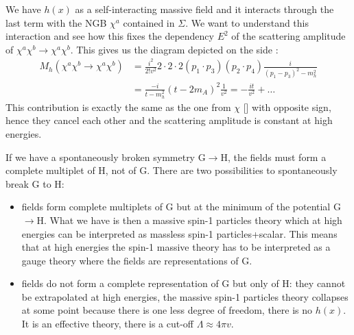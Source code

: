 \documentclass[../main.tex]{subfiles}
\begin{document}
We have $h(x)$ as a self-interacting massive field and it interacts through the last term with the NGB $\chi^a$ contained in $\Sigma$. We want to understand this interaction and see how this fixes the dependency $E^2$ of the scattering amplitude of $\chi^a\chi^b\to\chi^a\chi^b$. This gives us the diagram depicted on the side :
\begin{align*}
M_h(\chi^a\chi^b\to\chi^a\chi^b)&=\frac{i^2}{2!v^2}2\cdot2\cdot2(p_1\cdot p_3)(p_2\cdot p_4)\frac{i}{(p_1-p_3)^2-m_h^2}\\
&=\frac{-i}{t-m_h^2}(t-2m_A)^2\frac{1}{v^2}=-\frac{it}{v^2}+\dots
\end{align*}
This contribution is exactly the same as the one from $\chi$ [] with opposite sign, hence they cancel each other and the scattering amplitude is constant at high energies. 

If we have a spontaneously broken symmetry G$\to$H, the fields must form a complete multiplet of H, not of G. There are two possibilities to spontaneously break G to H:
\begin{itemize}
    \item fields form complete multiplets of G but at the minimum of the potential G$\to$H. What we have is then a massive spin-1 particles theory which at high energies can be interpreted as massless spin-1 particles+scalar. This means that at high energies the spin-1 massive theory has to be interpreted as a gauge theory where the fields are representations of G.
    \item fields do not form a complete representation of G but only of H: they cannot be extrapolated at high energies, the massive spin-1 particles theory collapses at some point because there is one less degree of freedom, there is no $h(x)$. It is an effective theory, there is a cut-off $\Lambda\approx4\pi v$.
\end{itemize}
\end{document}
